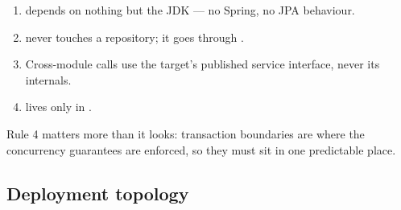 \documentclass[10pt,a4paper]{article}
\begin{document}
\begin{enumerate}
  \item {} depends on nothing but the JDK --- no Spring, no JPA behaviour.
  \item {} never touches a repository; it goes through .
  \item Cross-module calls use the target's published service interface, never its internals.
  \item {} lives only in .
\end{enumerate}

Rule 4 matters more than it looks: transaction boundaries are where the concurrency guarantees are
enforced, so they must sit in one predictable place.

\subsection{Deployment topology}
\end{document}

